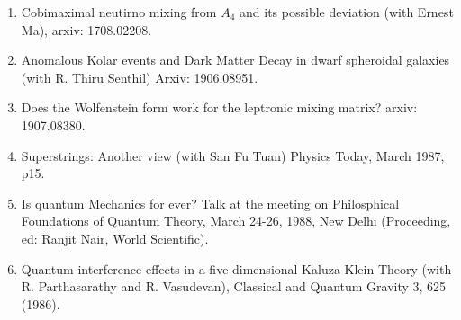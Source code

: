 \begin{enumerate}
\item Cobimaximal neutirno mixing from $A_4$ and its possible deviation (with Ernest Ma), arxiv: 1708.02208.

\item Anomalous Kolar events and Dark Matter Decay in dwarf spheroidal galaxies (with R. Thiru Senthil) Arxiv: 1906.08951.

\item Does the Wolfenstein form work for the leptronic mixing matrix? arxiv: 1907.08380.

\item Superstrings: Another view (with San Fu Tuan) Physics Today, March 1987, p15.

\item Is quantum Mechanics for ever? Talk at the meeting on Philosphical Foundations of Quantum Theory, March 24-26, 1988, New Delhi (Proceeding, ed: Ranjit Nair, World Scientific).

\item Quantum interference effects in a five-dimensional Kalu\-za-Klein Theory (with R. Parthasarathy and R. Vasudevan), Classical and Quantum Gravity 3, 625 (1986).
\end{enumerate}

\newpage
